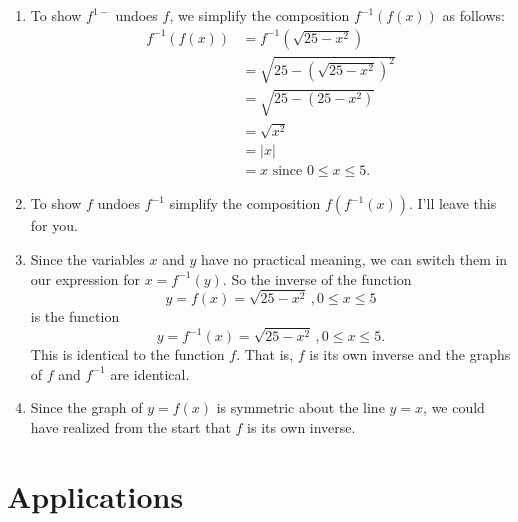 \documentclass{ximera}
\begin{document}
\begin{example}
\begin{explanation}
\begin{enumerate}
\item To show $f^{1-}$ undoes $f$, we simplify the composition $f^{-1}(f(x))$ as follows:
\begin{align*}
           f^{-1}(f(x)) &= f^{-1}(\sqrt{25-x^2})   \\
                             &= \sqrt{25 - \left( \sqrt{25-x^2}\right)^2}  \\
                             &= \sqrt{25 - (25-x^2)}  \\
                             &= \sqrt{x^2} \\
                             &= |x|  \\
                             &= x \text{ since } 0\leq x \leq 5.
\end{align*}

\item To show $f$ undoes $f^{-1}$ simplify the composition $f(f^{-1}(x))$. I'll leave this for you.

\begin{freeResponse}
\end{freeResponse}

\item Since the variables $x$ and $y$ have no practical meaning, we can switch them in our expression for $x = f^{-1}(y)$. So the inverse of the function
\[
    y=   f(x) = \sqrt{25-x^2} \, , 0\leq x \leq 5 
\]
is the function
\[
    y = f^{-1}(x) = \sqrt{25-x^2} \, , 0\leq x \leq 5 .
\]
This is identical to the function $f$. That is, $f$ is its own inverse and the graphs of $f$ and $f^{-1}$ are identical.

\item Since the graph of $y=f(x)$ is symmetric about the line $y=x$, we could have realized from the start that $f$ is its own inverse.

\end{enumerate}
\end{explanation}
\end{example}



\section{Applications}
\end{document}
